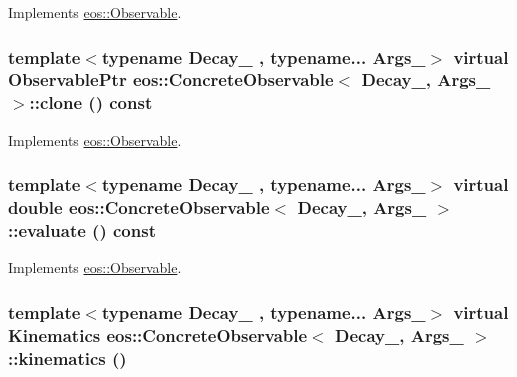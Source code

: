 Implements \hyperlink{classeos_1_1Observable_a20e8218d04aa5589ce795ddd425751a0}{eos::Observable}.\hypertarget{classeos_1_1ConcreteObservable_af84f6c7410ff512dc8edb36f4501e389}{
\subsubsection[{clone}]{\setlength{\rightskip}{0pt plus 5cm}template$<$typename Decay\_\- , typename... Args\_\-$>$ virtual {\bf ObservablePtr} {\bf eos::ConcreteObservable}$<$ Decay\_\-, Args\_\- $>$::clone () const}}
\label{classeos_1_1ConcreteObservable_af84f6c7410ff512dc8edb36f4501e389}


Implements \hyperlink{classeos_1_1Observable_a1c88c66a224a14fbddad70e95cb61136}{eos::Observable}.\hypertarget{classeos_1_1ConcreteObservable_a4127e180162b8f5eeebd55e7c8d1b7cf}{
\subsubsection[{evaluate}]{\setlength{\rightskip}{0pt plus 5cm}template$<$typename Decay\_\- , typename... Args\_\-$>$ virtual double {\bf eos::ConcreteObservable}$<$ Decay\_\-, Args\_\- $>$::evaluate () const}}
\label{classeos_1_1ConcreteObservable_a4127e180162b8f5eeebd55e7c8d1b7cf}


Implements \hyperlink{classeos_1_1Observable_a913385d3a077d578bbcc2d502e5fdc2d}{eos::Observable}.\hypertarget{classeos_1_1ConcreteObservable_abffd48fad6c67448f99c2024a6c81ad7}{
\subsubsection[{kinematics}]{\setlength{\rightskip}{0pt plus 5cm}template$<$typename Decay\_\- , typename... Args\_\-$>$ virtual {\bf Kinematics} {\bf eos::ConcreteObservable}$<$ Decay\_\-, Args\_\- $>$::kinematics ()}}
\label{classeos_1_1ConcreteObservable_abffd48fad6c67448f99c2024a6c81ad7}


